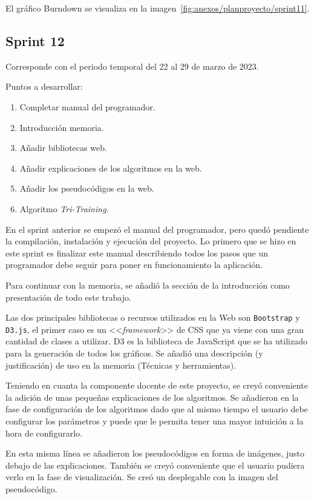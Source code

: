 El gráfico Burndown se visualiza en la imagen~\ref{fig:anexos/planproyecto/sprint11}.


\subsection{Sprint 12}
Corresponde con el periodo temporal del 22 al 29 de marzo de 2023.

Puntos a desarrollar:
\begin{enumerate}
    \item Completar manual del programador.
    \item Introducción memoria.
    \item Añadir bibliotecas web.
    \item Añadir explicaciones de los algoritmos en la web.
    \item Añadir los pseudocódigos en la web.
    \item Algoritmo \textit{Tri-Training}.
\end{enumerate}

En el sprint anterior se empezó el manual del programador, pero quedó pendiente
la compilación, instalación y ejecución del proyecto. Lo primero que se hizo en
este sprint es finalizar este manual describiendo todos los pasos que un
programador debe seguir para poner en funcionamiento la aplicación.

Para continuar con la memoria, se añadió la sección de la introducción como
presentación de todo este trabajo.

Las dos principales bibliotecas o recursos utilizados en la Web son
\texttt{Bootstrap} y \texttt{D3.js}, el primer caso es un <<\textit{framework}>>
de CSS que ya viene con una gran cantidad de clases a utilizar. D3 es la
biblioteca de JavaScript que se ha utilizado para la generación de todos los
gráficos. Se añadió una descripción (y justificación) de uso en la memoria
(Técnicas y herramientas).

Teniendo en cuanta la componente docente de este proyecto, se creyó conveniente
la adición de unas pequeñas explicaciones de los algoritmos. Se añadieron en la
fase de configuración de los algoritmos dado que al mismo tiempo el usuario debe
configurar los parámetros y puede que le permita tener una mayor intuición a la
hora de configurarlo.

En esta misma línea se añadieron los pseudocódigos en forma de imágenes, justo
debajo de las explicaciones. También se creyó conveniente que el usuario pudiera
verlo en la fase de visualización. Se creó un desplegable con la imagen del
pseudocódigo.

